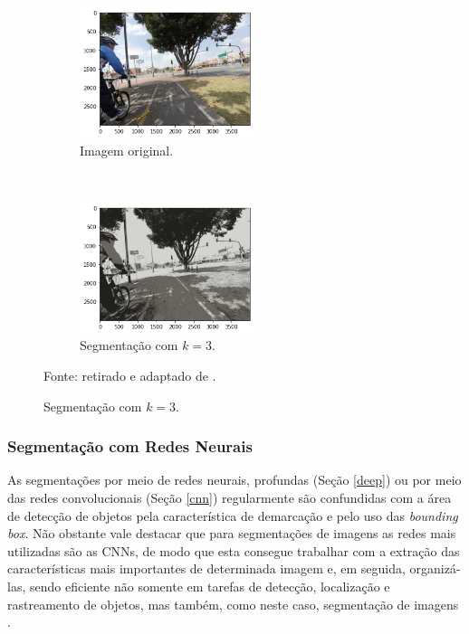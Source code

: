 \begin{figure}[H]
   \caption{Segmentação com K-means.}
   \centering
   \label{segment:fig:5}
    \begin{subfigure}[t]{0.45\textwidth}
        \centering
        \includegraphics[height=1.5in]{recursos/imagens/image_seg/i1.png}
        \caption{Imagem original.}
        \label{segment:fig:5.1}
    \end{subfigure}%
    ~ 
    \begin{subfigure}[t]{0.45\textwidth}
        \centering
        \includegraphics[height=1.5in]{recursos/imagens/image_seg/i2.png}
        \caption{Segmentação com $k = 3$.}
        \label{segment:fig:5.2}
    \end{subfigure}%

    Fonte: retirado e adaptado de \cite{Neuhold2017_ICCV}.
\end{figure}

\subsubsection{Segmentação com Redes Neurais}
\label{segment:neural}

As segmentações por meio de redes neurais, profundas (Seção \ref{deep}) ou por meio das redes convolucionais (Seção \ref{cnn}) regularmente são confundidas com a área de detecção de objetos \cite{Ghosh2019} pela característica de demarcação e pelo uso das \textit{bounding box}. Não obstante vale destacar que para segmentações de imagens as redes mais utilizadas são as CNNs, de modo que esta consegue trabalhar com a extração das características mais importantes de determinada imagem e, em seguida, organizá-las, sendo eficiente não somente em tarefas de detecção, localização e rastreamento de objetos, mas também, como neste caso, segmentação de imagens \cite{Ghosh2019}.

